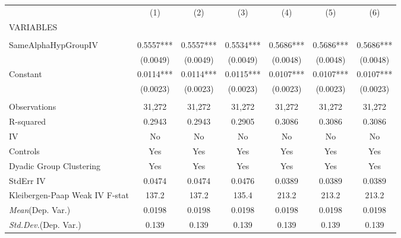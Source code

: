 \documentclass[]{article}
\begin{document}
\begin{tabular}{lcccccc} \hline
 & (1) & (2) & (3) & (4) & (5) & (6) \\
VARIABLES &  &  &  &  &  &  \\ \hline
 &  &  &  &  &  &  \\
SameAlphaHypGroupIV & 0.5557*** & 0.5557*** & 0.5534*** & 0.5686*** & 0.5686*** & 0.5686*** \\
 & (0.0049) & (0.0049) & (0.0049) & (0.0048) & (0.0048) & (0.0048) \\
Constant & 0.0114*** & 0.0114*** & 0.0115*** & 0.0107*** & 0.0107*** & 0.0107*** \\
 & (0.0023) & (0.0023) & (0.0023) & (0.0023) & (0.0023) & (0.0023) \\
 &  &  &  &  &  &  \\
Observations & 31,272 & 31,272 & 31,272 & 31,272 & 31,272 & 31,272 \\
R-squared & 0.2943 & 0.2943 & 0.2905 & 0.3086 & 0.3086 & 0.3086 \\
IV & No & No & No & No & No & No \\
Controls & Yes & Yes & Yes & Yes & Yes & Yes \\
Dyadic Group Clustering & Yes & Yes & Yes & Yes & Yes & Yes \\
StdErr IV & 0.0474 & 0.0474 & 0.0476 & 0.0389 & 0.0389 & 0.0389 \\
Kleibergen-Paap Weak IV F-stat & 137.2 & 137.2 & 135.4 & 213.2 & 213.2 & 213.2 \\
\textit{Mean}(Dep. Var.) & 0.0198 & 0.0198 & 0.0198 & 0.0198 & 0.0198 & 0.0198 \\
 \textit{Std.Dev.}(Dep. Var.) & 0.139 & 0.139 & 0.139 & 0.139 & 0.139 & 0.139 \\ \hline
\end{tabular}
\end{document}
